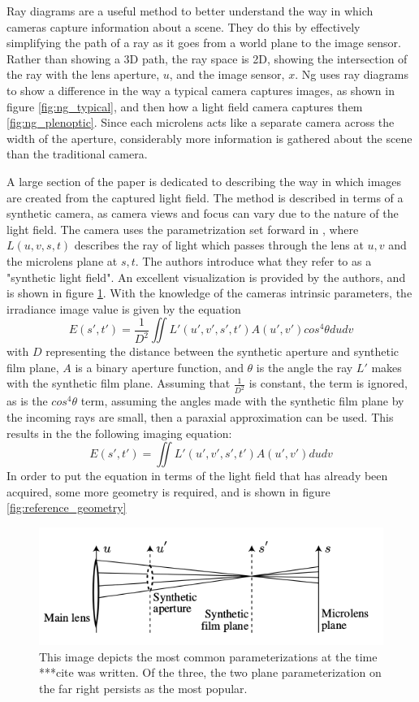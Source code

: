\documentclass[12pt]{report}
\begin{document}
Ray diagrams are a useful method to better understand the way in which cameras capture information about a scene. They do this by effectively simplifying the path of a ray as it goes from a world plane to the image sensor. Rather than showing a 3D path, the ray space is 2D, showing the intersection of the ray with the lens aperture, $u$, and the image sensor, $x$. Ng uses ray diagrams to show a difference in the way a typical camera captures images, as shown in figure \ref{fig:ng_typical}, and then how a light field camera captures them \ref{fig:ng_plenoptic}. Since each microlens acts like a separate camera across the width of the aperture, considerably more information is gathered about the scene than the traditional camera.

A large section of the paper is dedicated to describing the way in which images are created from the captured light field. The method is described in terms of a synthetic camera, as camera views and focus can vary due to the nature of the light field. The camera uses the parametrization set forward in \cite{Levoy96}, where $L(u,v,s,t)$ describes the ray of light which passes through the lens at $u, v$ and the microlens plane at $s, t$. The authors introduce what they refer to as a "synthetic light field". An excellent visualization is provided by the authors, and is shown in figure \ref{fig:synthetic_image_creation}. With the knowledge of the cameras intrinsic parameters, the irradiance image value is given by the equation 
\begin{equation}
E(s',t')=\frac{1}{D^2} \iint L'(u',v',s',t') A(u',v') cos^4\theta du dv
\end{equation}
with $D$ representing the distance between the synthetic aperture and synthetic film plane, $A$ is a binary aperture function, and $\theta$ is the angle the ray $L'$ makes with the synthetic film plane. Assuming that $\frac{1}{D^2}$ is constant, the term is ignored, as is the $cos^4 \theta$ term, assuming the angles made with the synthetic film plane by the incoming rays are small, then a paraxial approximation can be used. This results in the the following imaging equation:
\begin{equation}
E(s',t')=\iint L'(u',v',s',t')A(u',v')dudv
\end{equation}
In order to put the equation in terms of the light field that has already been acquired, some more geometry is required, and is shown in figure \ref{fig:reference_geometry}
\begin{figure}[!ht]
	\centering
	\includegraphics[scale=0.75]{synthetic_image_creation.png}
	\caption{This image depicts the most common parameterizations at the time ***cite was written. Of the three, the two plane parameterization on the far right persists as the most popular.}
	\label{fig:synthetic_image_creation}
\end{figure}
\end{document}
